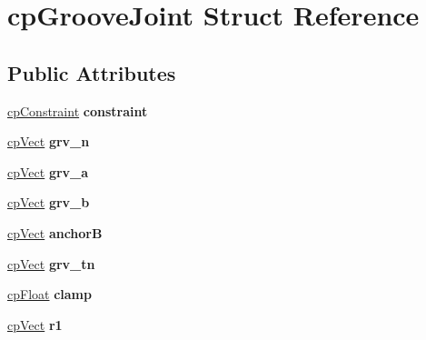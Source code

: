 \hypertarget{structcp_groove_joint}{}\section{cp\+Groove\+Joint Struct Reference}
\label{structcp_groove_joint}
\subsection*{Public Attributes}
\begin{DoxyCompactItemize}
\item 
\mbox{\label{structcp_groove_joint_ace538974771b2451ff70e390a45331dd}} 
\mbox{\hyperlink{structcp_constraint}{cp\+Constraint}} {\bfseries constraint}
\item 
\mbox{\label{structcp_groove_joint_aeb76e2ae638c54a139b2c3cfe42d5156}} 
\mbox{\hyperlink{structcp_vect}{cp\+Vect}} {\bfseries grv\+\_\+n}
\item 
\mbox{\label{structcp_groove_joint_af0379447d1b65fac0796bea674c4bcc8}} 
\mbox{\hyperlink{structcp_vect}{cp\+Vect}} {\bfseries grv\+\_\+a}
\item 
\mbox{\label{structcp_groove_joint_a35db57ba915f335aa1d2e7166d717dd7}} 
\mbox{\hyperlink{structcp_vect}{cp\+Vect}} {\bfseries grv\+\_\+b}
\item 
\mbox{\label{structcp_groove_joint_a3a883b8d3c31700b2269a9a049a82cdc}} 
\mbox{\hyperlink{structcp_vect}{cp\+Vect}} {\bfseries anchorB}
\item 
\mbox{\label{structcp_groove_joint_a83f1d7191fd95192d586276f6da9e9ac}} 
\mbox{\hyperlink{structcp_vect}{cp\+Vect}} {\bfseries grv\+\_\+tn}
\item 
\mbox{\label{structcp_groove_joint_ab443f50c8e95df7153215af6ae9699f9}} 
\mbox{\hyperlink{group__basic_types_gac1ed65573e035bf892505768c852d8d3}{cp\+Float}} {\bfseries clamp}
\item 
\mbox{\label{structcp_groove_joint_afe9dd098205f571cc637f89c4e952dc4}} 
\mbox{\hyperlink{structcp_vect}{cp\+Vect}} {\bfseries r1}

\end{DoxyCompactItemize}

